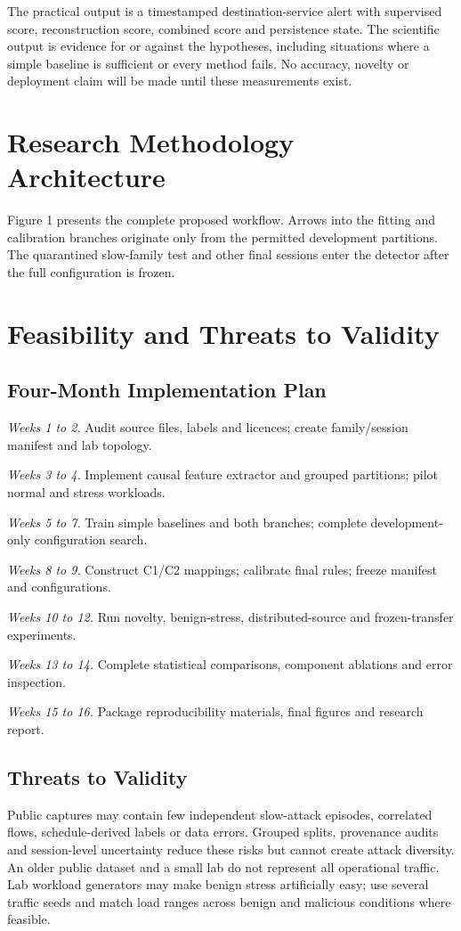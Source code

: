 \documentclass[conference]{IEEEtran}
\begin{document}
The practical output is a timestamped destination-service alert with supervised score, reconstruction score, combined score and persistence state. The scientific output is evidence for or against the hypotheses, including situations where a simple baseline is sufficient or every method fails. No accuracy, novelty or deployment claim will be made until these measurements exist.

\section{Research Methodology Architecture}
\label{sec:architecture}
Figure 1 presents the complete proposed workflow. Arrows into the fitting and calibration branches originate only from the permitted development partitions. The quarantined slow-family test and other final sessions enter the detector after the full configuration is frozen.

\section{Feasibility and Threats to Validity}
\label{sec:validity}
\subsection{Four-Month Implementation Plan}
\noindent\textit{Weeks 1 to 2.} Audit source files, labels and licences; create family/session manifest and lab topology.

\noindent\textit{Weeks 3 to 4.} Implement causal feature extractor and grouped partitions; pilot normal and stress workloads.

\noindent\textit{Weeks 5 to 7.} Train simple baselines and both branches; complete development-only configuration search.

\noindent\textit{Weeks 8 to 9.} Construct C1/C2 mappings; calibrate final rules; freeze manifest and configurations.

\noindent\textit{Weeks 10 to 12.} Run novelty, benign-stress, distributed-source and frozen-transfer experiments.

\noindent\textit{Weeks 13 to 14.} Complete statistical comparisons, component ablations and error inspection.

\noindent\textit{Weeks 15 to 16.} Package reproducibility materials, final figures and research report.

\subsection{Threats to Validity}
Public captures may contain few independent slow-attack episodes, correlated flows, schedule-derived labels or data errors. Grouped splits, provenance audits and session-level uncertainty reduce these risks but cannot create attack diversity. An older public dataset and a small lab do not represent all operational traffic. Lab workload generators may make benign stress artificially easy; use several traffic seeds and match load ranges across benign and malicious conditions where feasible.
\end{document}

